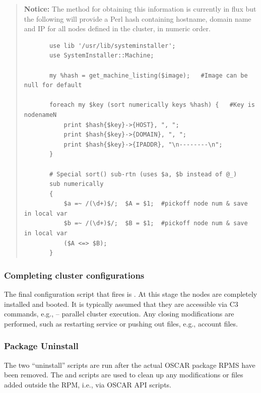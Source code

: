 \begin{verse}
   {\bfseries Notice: } The method for obtaining this information is
   currently in flux but the following will provide a Perl hash containing
   hostname,  domain name and IP for all nodes defined in the cluster, in
   numeric order.
  \begin{footnotesize}
  \begin{verbatim}
       use lib '/usr/lib/systeminstaller';
       use SystemInstaller::Machine;

       my %hash = get_machine_listing($image);   #Image can be null for default

       foreach my $key (sort numerically keys %hash) {   #Key is nodenameN
           print $hash{$key}->{HOST}, ", ";
           print $hash{$key}->{DOMAIN}, ", ";
           print $hash{$key}->{IPADDR}, "\n--------\n";
       }

       # Special sort() sub-rtn (uses $a, $b instead of @_)
       sub numerically 
       {
           $a =~ /(\d+)$/;  $A = $1;  #pickoff node num & save in local var
           $b =~ /(\d+)$/;  $B = $1;  #pickoff node num & save in local var
           ($A <=> $B);
       }
  \end{verbatim}
  \end{footnotesize}
\end{verse}



\subsubsection{Completing cluster configurations}

The final configuration script that fires is .  At this
stage the nodes are completely installed and booted.  It is typically
assumed that they are accessible via C3 commands, e.g.,  --
parallel cluster execution.  Any closing modifications are performed, such as
restarting service or pushing out files, e.g.,  account files.

\subsubsection{Package Uninstall}

The two ``uninstall'' scripts are run after the actual OSCAR package RPMS
have been removed.  The  and
 scripts are used to clean up any
modifications or files added outside the RPM, i.e., via OSCAR API scripts.


